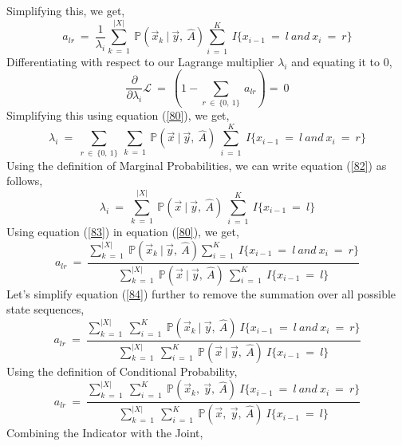 \documentclass[12pt, draftcls, onecolumn]{IEEEtran}
\begin{document}
Simplifying this, we get,
\begin{equation}\label{80}
    a_{lr}\ =\ \frac{1}{\lambda_i} \sum_{k\ =\ 1}^{|X|}\ \mathbb{P}(\vec{x}_k\ |\ \vec{y},\ \hat{A}) \sum_{i\ =\ 1}^{K}\ I\{x_{i-1}\ =\ l\ and\ x_i\ =\ r\}
\end{equation}
Differentiating with respect to our Lagrange multiplier $\lambda_i$ and equating it to 0,
\begin{equation}\label{81}
    \frac{\partial}{\partial \lambda_i}\mathcal{L}\ =\ (1-\sum_{r\ \in\ \{0,\ 1\}}\ a_{lr}) =\ 0
\end{equation}
Simplifying this using equation (\ref{80}), we get,
\begin{equation}\label{82}
    \lambda_i\ =\ \sum_{r\ \in\ \{0,\ 1\}}\ \sum_{k\ =\ 1}\ \mathbb{P}(\vec{x}\ |\ \vec{y},\ \hat{A})\ \sum_{i\ =\ 1}^{K}\ I\{x_{i-1}\ =\ l\ and\ x_i\ =\ r\}
\end{equation}
Using the definition of Marginal Probabilities, we can write equation (\ref{82}) as follows,
\begin{equation}\label{83}
    \lambda_i\ =\ \sum_{k\ =\ 1}^{|X|}\ \mathbb{P}(\vec{x}\ |\ \vec{y},\ \hat{A})\ \sum_{i\ =\ 1}^{K}\ I\{x_{i-1}\ =\ l\}
\end{equation}
Using equation (\ref{83}) in equation (\ref{80}), we get,
\begin{equation}\label{84}
    a_{lr}\ =\ \frac{\sum_{k\ =\ 1}^{|X|}\ \mathbb{P}(\vec{x}_k\ |\ \vec{y},\ \hat{A}) \sum_{i\ =\ 1}^{K}\ I\{x_{i-1}\ =\ l\ and\ x_i\ =\ r\}}{\sum_{k\ =\ 1}^{|X|}\ \mathbb{P}(\vec{x}\ |\ \vec{y},\ \hat{A})\ \sum_{i\ =\ 1}^{K}\ I\{x_{i-1}\ =\ l\}}
\end{equation}
Let's simplify equation (\ref{84}) further to remove the summation over all possible state sequences,
\begin{equation}\label{85}
    a_{lr}\ =\ \frac{\sum_{k\ =\ 1}^{|X|}\ \sum_{i\ =\ 1}^{K}\ \mathbb{P}(\vec{x}_k\ |\ \vec{y},\ \hat{A})\ I\{x_{i-1}\ =\ l\ and\ x_i\ =\ r\}}{\sum_{k\ =\ 1}^{|X|}\ \sum_{i\ =\ 1}^{K}\ \mathbb{P}(\vec{x}\ |\ \vec{y},\ \hat{A})\ I\{x_{i-1}\ =\ l\}}
\end{equation}
Using the definition of Conditional Probability,
\begin{equation}\label{86}
    a_{lr}\ =\ \frac{\sum_{k\ =\ 1}^{|X|}\ \sum_{i\ =\ 1}^{K}\ \mathbb{P}(\vec{x}_k,\ \vec{y},\ \hat{A})\ I\{x_{i-1}\ =\ l\ and\ x_i\ =\ r\}}{\sum_{k\ =\ 1}^{|X|}\ \sum_{i\ =\ 1}^{K}\ \mathbb{P}(\vec{x},\ \vec{y},\ \hat{A})\ I\{x_{i-1}\ =\ l\}}
\end{equation}
Combining the Indicator with the Joint,
\end{document}
